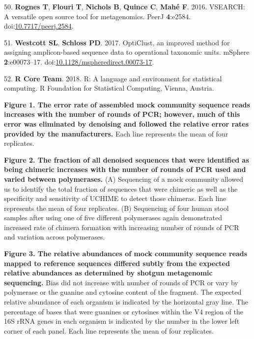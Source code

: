 \documentclass[11pt,]{article}
\begin{document}
\leavevmode\hypertarget{ref-Rognes2016}{}%
50. \textbf{Rognes T}, \textbf{Flouri T}, \textbf{Nichols B},
\textbf{Quince C}, \textbf{Mahé F}. 2016. VSEARCH: A versatile open
source tool for metagenomics. PeerJ \textbf{4}:e2584.
doi:\href{https://doi.org/10.7717/peerj.2584}{10.7717/peerj.2584}.

\leavevmode\hypertarget{ref-Westcott2017}{}%
51. \textbf{Westcott SL}, \textbf{Schloss PD}. 2017. OptiClust, an
improved method for assigning amplicon-based sequence data to
operational taxonomic units. mSphere \textbf{2}:e00073--17.
doi:\href{https://doi.org/10.1128/mspheredirect.00073-17}{10.1128/mspheredirect.00073-17}.

\leavevmode\hypertarget{ref-r_citation_2018}{}%
52. \textbf{R Core Team}. 2018. R: A language and environment for
statistical computing. R Foundation for Statistical Computing, Vienna,
Austria.

\newpage

\textbf{Figure 1. The error rate of assembled mock community sequence
reads increases with the number of rounds of PCR; however, much of this
error was eliminated by denoising and followed the relative error rates
provided by the manufacturers.} Each line represents the mean of four
replicates.

\textbf{Figure 2. The fraction of all denoised sequences that were
identified as being chimeric increases with the number of rounds of PCR
used and varied between polymerases.} (A) Sequencing of a mock community
allowed us to identify the total fraction of sequences that were
chimeric as well as the specificity and sensitivity of UCHIME to detect
those chimeras. Each line represents the mean of four replicates. (B)
Sequencing of four human stool samples after using one of five different
polymerases again demonstrated increased rate of chimera formation with
increasing number of rounds of PCR and variation across polymerases.

\textbf{Figure 3. The relative abundances of mock community sequence
reads mapped to reference sequences differed subtly from the expected
relative abundances as determined by shotgun metagenomic sequencing.}
Bias did not increase with number of rounds of PCR or vary by polymerase
or the guanine and cytosine content of the fragment. The expected
relative abundance of each organism is indicated by the horizontal gray
line. The percentage of bases that were guanines or cytosines within the
V4 region of the 16S rRNA genes in each organism is indicated by the
number in the lower left corner of each panel. Each line represents the
mean of four replicates.
\end{document}
